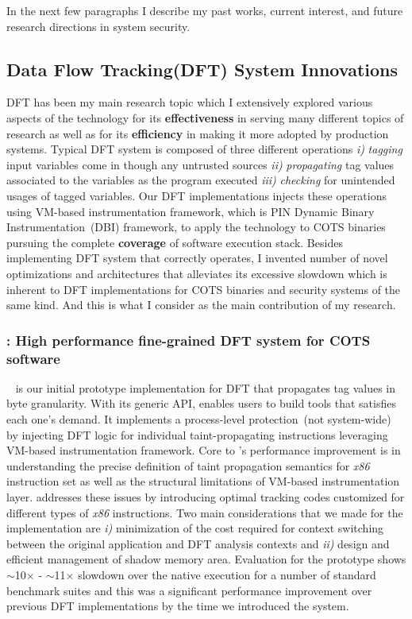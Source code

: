 \documentclass[letterpaper, 10pt]{article}
\begin{document}
\begin{small}
In the next few paragraphs I describe my past works, current interest, and
future research directions in system security.

\subsection*{Data Flow Tracking(DFT) System Innovations}
%
DFT has been my main research topic which I extensively explored various
aspects of the technology for its {\bf effectiveness} in serving many different
topics of research as well as for its {\bf efficiency} in making it more
adopted by production systems.
%
Typical DFT system is composed of three different operations {\it i)} {\it
tagging} input variables come in though any untrusted sources {\it ii)} {\it
propagating} tag values associated to the variables as the program executed
{\it iii)} {\it checking} for unintended usages of tagged variables. 
%
Our DFT implementations injects these operations using VM-based instrumentation
framework, which is PIN Dynamic Binary Instrumentation~(DBI) framework, to
apply the technology to COTS binaries pursuing the complete {\bf coverage} of
software execution stack.
%
Besides implementing DFT system that correctly operates, I invented number of
novel optimizations and architectures that alleviates its excessive slowdown
which is inherent to DFT implementations for COTS binaries and security systems
of the same kind. And this is what I consider as the main contribution of my
research.

\subsubsection*{\libdft: High performance fine-grained DFT system for COTS
software}

\libdft~\cite{libdft:2012vee} is our initial prototype implementation for DFT
that propagates tag values in byte granularity.
%
With its generic API, \libdft enables users to build tools that satisfies each
one's demand. It implements a process-level protection~(not system-wide) by
injecting DFT logic for individual taint-propagating instructions leveraging
VM-based instrumentation framework.
%
Core to \libdft's performance improvement is in understanding the precise
definition of taint propagation semantics for {\it x86} instruction set as well
as the structural limitations of VM-based instrumentation layer. \libdft
addresses these issues by introducing optimal tracking codes customized for
different types of {\it x86} instructions. Two main considerations that we made
for the implementation are {\it i)} minimization of the cost required for
context switching between the original application and DFT analysis contexts
and {\it ii)} design and efficient management of shadow memory area.
%
Evaluation for the prototype shows $\sim$10$\times$ - $\sim$11$\times$ slowdown
over the native execution for a number of standard benchmark suites and this
was a significant performance improvement over previous DFT implementations by
the time we introduced the system.


\end{small}
\end{document}
